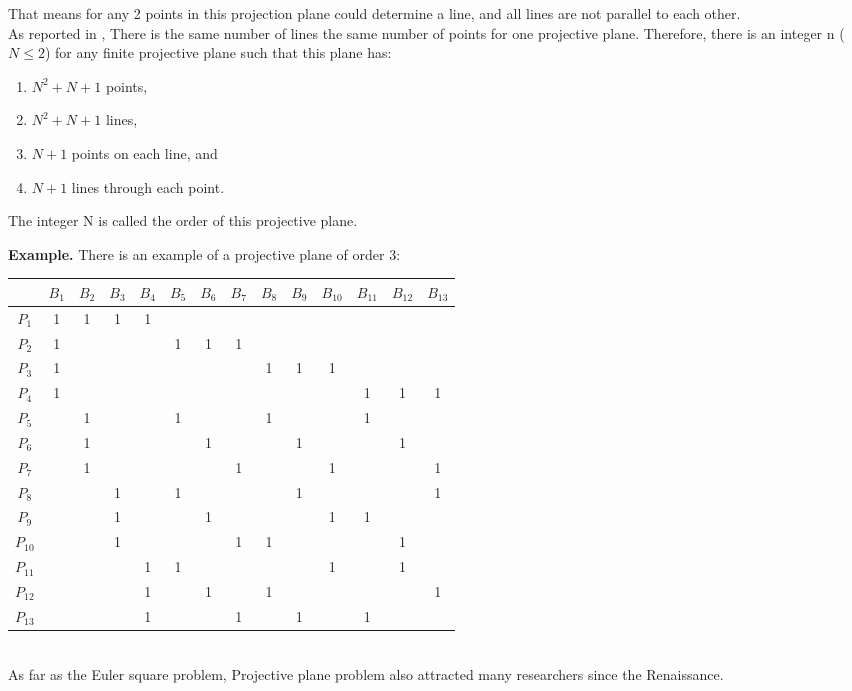 \documentclass[12pt]{article}
\begin{document}
That means for any 2 points in this projection plane could determine a line, and all lines are not parallel to each other.\\

As reported in \cite{ref14}, There is the same number of lines the same number of points for one projective plane. Therefore, there is an integer n ($N\le2$) for any finite projective plane such that this plane has:
\begin{enumerate}[1.]
\item $N^2 + N + 1$ points,
\item $N^2 + N + 1$ lines,
\item $N + 1$ points on each line, and
\item $N + 1$ lines through each point.
\end{enumerate}

The integer N is called the order of this projective plane.

\textbf{Example.} There is an example of a projective plane of order 3:

\begin{tabular}{|c|c|c|c|c|c|c|c|c|c|c|c|c|c|}
\hline
   &$B_1$&$B_2$&$B_3$&$B_4$&$B_5$&$B_6$&$B_7$&$B_8$&$B_9$&$B_{10}$&$B_{11}$&$B_{12}$&$B_{13}$\\
\hline
$P_1$&1&1&1&1& & & & & & & & & \\
\hline
$P_2$&1& & & &1&1&1& & & & & & \\
\hline
$P_3$&1& & & & & & &1&1&1& & & \\
\hline
$P_4$&1& & & & & & & & & &1&1&1\\
\hline
$P_5$& &1& & &1& & &1& & &1& & \\
\hline
$P_6$& &1& & & &1& & &1& & &1& \\
\hline
$P_7$& &1& & & & &1& & &1& & &1\\
\hline
$P_8$& & &1& &1& & & &1& & & &1\\
\hline
$P_9$& & &1& & &1& & & &1&1& & \\
\hline
$P_{10}$& & &1& & & &1&1& & & &1& \\
\hline
$P_{11}$& & & &1&1& & & & &1& &1& \\
\hline
$P_{12}$& & & &1& &1& &1& & & & &1\\
\hline
$P_{13}$& & & &1& & &1& &1& &1& & \\
\hline
\end{tabular} \\


As far as the Euler square problem, Projective plane problem also attracted many researchers since the Renaissance. \\
\end{document}
